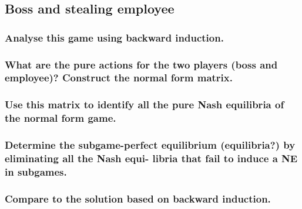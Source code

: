 \subsection{Boss and stealing employee}
\subsubsection{Analyse this game using backward induction.}
\subsubsection{What are the pure actions for the two players (boss and employee)? Construct the normal form matrix.}
\subsubsection{Use this matrix to identify all the pure Nash equilibria of the normal form game.}
\subsubsection{Determine the subgame-perfect equilibrium (equilibria?) by eliminating all the Nash equi- libria that fail to induce a NE in subgames.}
\subsubsection{Compare to the solution based on backward induction.}